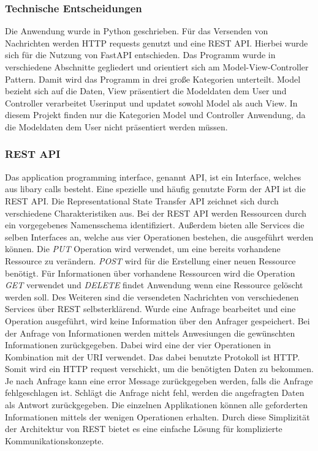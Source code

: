 \subsubsection{Technische Entscheidungen}
Die Anwendung wurde in Python geschrieben. Für das Versenden von Nachrichten werden HTTP requests genutzt und eine REST API. Hierbei wurde sich für die Nutzung von FastAPI entschieden\cite{fastapi}. 
Das Programm wurde in verschiedene Abschnitte gegliedert und orientiert sich am Model-View-Controller Pattern. 
Damit wird das Programm in drei große Kategorien unterteilt. 
Model bezieht sich auf die Daten, View präsentiert die Modeldaten dem User und Controller verarbeitet Userinput und updatet sowohl Model als auch View.
In diesem Projekt finden nur die Kategorien Model und Controller Anwendung, da die Modeldaten dem User nicht präsentiert werden müssen.
\subsubsection{REST API}
Das application programming interface, genannt API, ist ein Interface, welches aus libary calls besteht\cite[S. 129]{steen23}.
Eine spezielle und häufig genutzte Form der API ist die REST API. Die Representational State Transfer API zeichnet sich durch verschiedene Charakteristiken aus.
Bei der REST API werden Ressourcen durch ein vorgegebenes Namensschema identifiziert.
Außerdem bieten alle Services die selben Interfaces an, welche aus vier Operationen bestehen, die ausgeführt werden können. 
Die \emph{PUT} Operation wird verwendet, um eine bereits vorhandene Ressource zu verändern. \emph{POST} wird für die Erstellung einer neuen Ressource benötigt.
Für Informationen über vorhandene Ressourcen wird die Operation \emph{GET} verwendet und \emph{DELETE} findet Anwendung wenn eine Ressource gelöscht werden soll.
Des Weiteren sind die versendeten Nachrichten von verschiedenen Services über REST selbsterklärend.
Wurde eine Anfrage bearbeitet und eine Operation ausgeführt, wird keine Information über den Anfrager gespeichert. 
Bei der Anfrage von Informationen werden mittels Anwesiungen die gewünschten Informationen zurückgegeben. Dabei wird eine der vier Operationen 
in Kombination mit der URI verwendet\cite[S. 66f]{steen23}. Das dabei benutzte Protokoll ist HTTP.
Somit wird ein HTTP request verschickt, um die benötigten Daten zu bekommen. 
Je nach Anfrage kann eine error Message zurückgegeben werden, falls die Anfrage fehlgeschlagen ist. 
Schlägt die Anfrage nicht fehl, werden die angefragten Daten als Antwort zurückgegeben. 
Die einzelnen Applikationen können alle geforderten Informationen mittels der wenigen Operationen erhalten\cite[S.67 ]{steen23}. 
Durch diese Simplizität der Architektur von REST bietet es eine einfache Lösung für komplizierte Kommunikationskonzepte.
